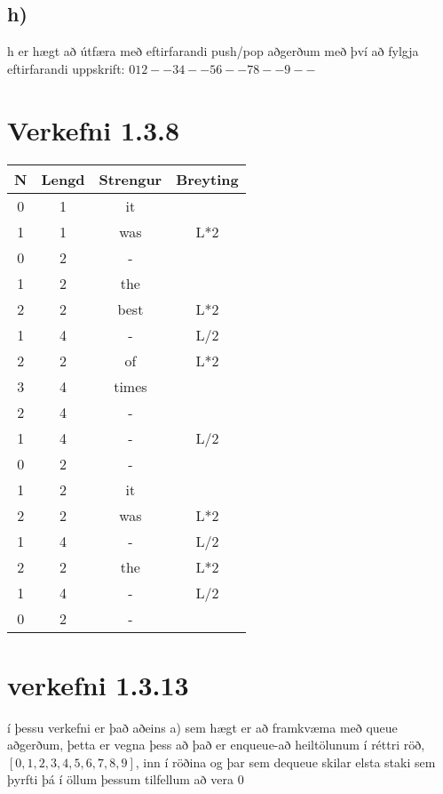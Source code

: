 \documentclass{article}
\begin{document}
\subsection*{h)}
h er hægt að útfæra með eftirfarandi push/pop aðgerðum með því að fylgja eftirfarandi uppskrift:
$012--34--56--78--9--$


\section*{Verkefni 1.3.8}
\begin{center}
    \begin{tabular}{|c|c|c|c|}
        \hline
        N&Lengd&Strengur&Breyting\\
        \hline
        0&1&it&\\
        \hline
        1&1&was&L*2\\
        \hline
        0&2&-&\\
        \hline
        1&2&the&\\
        \hline
        2&2&best&L*2\\
        \hline
        1&4&-&L/2\\
        \hline
        2&2&of&L*2\\
        \hline
        3&4&times&\\
        \hline
        2&4&-&\\
        \hline
        1&4&-&L/2\\
        \hline
        0&2&-&\\
        \hline
        1&2&it&\\
        \hline
        2&2&was&L*2\\
        \hline
        1&4&-&L/2\\
        \hline
        2&2&the&L*2\\
        \hline
        1&4&-&L/2\\
        \hline
        0&2&-&\\
        \hline
    \end{tabular}
\end{center}


\section*{verkefni 1.3.13}
í þessu verkefni er það aðeins a) sem hægt er að framkvæma með queue aðgerðum, þetta er vegna þess að það er enqueue-að heiltölunum í réttri röð, $[0,1,2,3,4,5,6,7,8,9]$, inn í röðina og þar sem dequeue skilar elsta staki sem þyrfti þá í öllum þessum tilfellum að vera $0$
\end{document}
